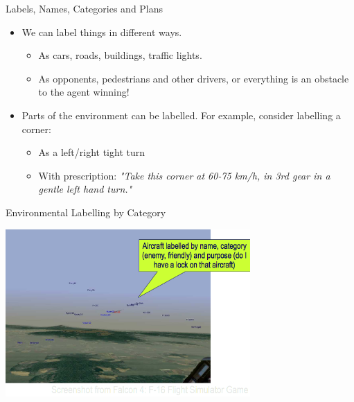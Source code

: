 \documentclass[aspectratio=1610,xcolor=dvipsnames,t]{beamer}
\begin{document}
\begin{frame}{Labels, Names, Categories and Plans}
    \begin{itemize}
        \item We can label things in different ways.
            \begin{itemize}
                \item As cars, roads, buildings, traffic lights.
                \item As opponents, pedestrians and other drivers, 
                      or everything is an obstacle to the 
                      agent winning!
            \end{itemize}
        \item Parts of the environment can be labelled. 
              For example, consider labelling a corner:
              \begin{itemize}
                    \item As a left/right tight turn
                    \item With prescription: \emph{"Take this corner
                            at 60-75 km/h, in 3rd gear in a gentle
                        left hand turn."} 
              \end{itemize}
    \end{itemize}
\end{frame} 

\begin{frame}{Environmental Labelling by Category} 
    \begin{center}
        \includegraphics[width=0.7\textwidth]{falcon} 
    \end{center}
\end{frame}
\end{document}
